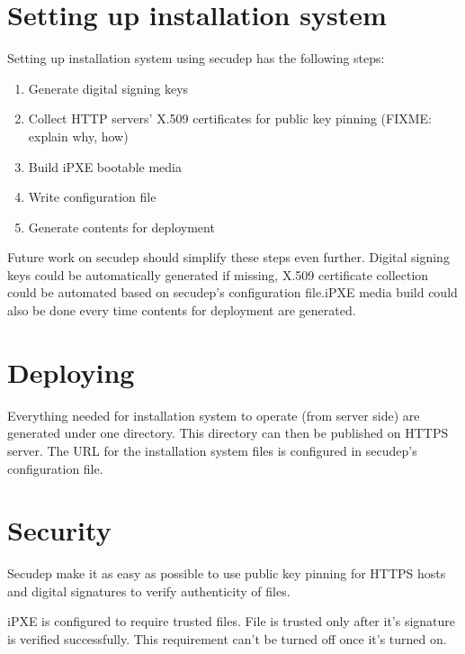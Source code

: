 \section{Setting up installation system}

Setting up installation system using secudep has the following steps:

\begin{enumerate}
  \item Generate digital signing keys
  \item Collect HTTP servers' X.509 certificates for public key pinning (FIXME: explain why, how)
  \item Build iPXE bootable media
  \item Write configuration file
  \item Generate contents for deployment
\end{enumerate}

Future work on secudep should simplify these steps even further.
Digital signing keys could be automatically generated if missing,
X.509 certificate collection could be automated based on secudep's
configuration file.\@ iPXE media build could also be done every time
contents for deployment are generated.

\section{Deploying}

Everything needed for installation system to operate (from server
side) are generated under one directory. This directory can then be
published on HTTPS server. The URL for the installation system files
is configured in secudep's configuration file.

\section{Security}

Secudep make it as easy as possible to use public key pinning for
HTTPS hosts and digital signatures to verify authenticity of files.

iPXE is configured to require trusted files. File is trusted only
after it's signature is verified successfully. This requirement can't
be turned off once it's turned on.
